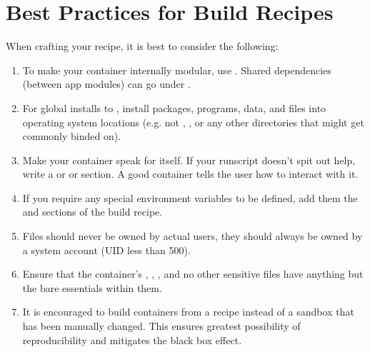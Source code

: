 \documentclass[letterpaper,10pt,english]{sphinxmanual}
\begin{document}
\section{Best Practices for Build Recipes}
\label{\detokenize{container_recipes:best-practices-for-build-recipes}}
When crafting your recipe, it is best to consider the following:
\begin{enumerate}
\item {} 
To make your container internally modular, use . Shared dependencies
(between app modules) can go under .

\item {} 
For global installs to , install packages, programs, data, and files
into operating system locations (e.g. not ,  , or any other
directories that might get commonly binded on).

\item {} 
Make your container speak for itself. If your runscript doesn’t spit
out help, write a  or  or  section. A good container tells the user how
to interact with it.

\item {} 
If you require any special environment variables to be defined, add
them the  and  sections of the build recipe.

\item {} 
Files should never be owned by actual users, they should always be
owned by a system account (UID less than 500).

\item {} 
Ensure that the container’s  ,  ,  , and no other sensitive files have
anything but the bare essentials within them.

\item {} 
It is encouraged to build containers from a recipe instead of a
sandbox that has been manually changed. This ensures greatest
possibility of reproducibility and mitigates the black box effect.

\end{enumerate}
\end{document}
